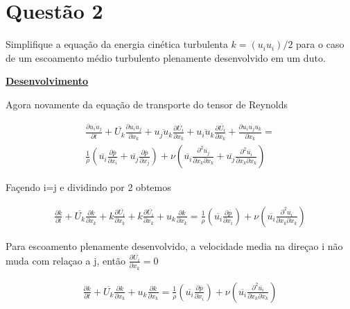 \documentclass[12pt]{article}
\begin{document}
\section*{Questão 2}

Simplifique a equação da energia cinética turbulenta $k = (u_i u_i)/2$ para o caso de um
escoamento médio turbulento plenamente desenvolvido em um duto.


\textbf{\underline{Desenvolvimento}}

Agora novamente da equação de transporte do tensor de Reynolds

\begin{equation}
	\begin{split}
		\frac{\partial \overline{u_i u_j}}{\partial t} 		
		+ \overline{U_k} \frac{\partial \overline{u_i u_j}}{\partial x_k} + \overline{u_j u_k} \frac{\partial \overline{U_i}}{\partial x_k} + \overline{u_i u_k} \frac{\partial \overline{U_i}}{\partial x_k} + \frac{\partial \overline{u_i u_j u_k}}{\partial x_k}		
		= \\
		\frac{1}{\rho} \left( \overline{u_i}\frac{\partial \overline{p}}{\partial x_i} + \overline{u_j}  \frac{\partial \overline{p}}{\partial x_j} \right) + \nu \left(  \overline{u_i}\frac{\partial ^ 2  \overline{u_j}}{\partial x_k \partial x_k} + \overline
		{u_j}\frac{\partial ^ 2 \overline{u_i}}{\partial x_k \partial x_k}\right) 
	\end{split}
\end{equation}

Façendo i=j e dividindo por 2 obtemos

\begin{equation}
	\begin{split}
		\frac{\partial k}{\partial t} 		
		+ \overline{U_k} \frac{\partial k}{\partial x_k} + k\frac{\partial \overline{U_i}}{\partial x_k} + k\frac{\partial \overline{U_i}}{\partial x_k} + u_k\frac{\partial k}{\partial x_k}		
		= \frac{1}{\rho} \left( \overline{u_i}\frac{\partial \overline{p}}{\partial x_i}  \right) + \nu \left(  \overline{u_i}\frac{\partial ^ 2  \overline{u_i}}{\partial x_k \partial x_k} \right) 
	\end{split}
\end{equation}

Para escoamento plenamente desenvolvido, a velocidade media na direçao i não muda com relaçao a j, então $\frac{\partial \overline{U_i}}{\partial x_k} = 0$

\begin{equation}
	\begin{split}
		\frac{\partial k}{\partial t} 		
		+ \overline{U_k} \frac{\partial k}{\partial x_k} + u_k\frac{\partial k}{\partial x_k}		
		= \frac{1}{\rho} \left( \overline{u_i}\frac{\partial \overline{p}}{\partial x_i}  \right) + \nu \left(  \overline{u_i}\frac{\partial ^ 2  \overline{u_i}}{\partial x_k \partial x_k} \right) 
	\end{split}
\end{equation}
\end{document}

